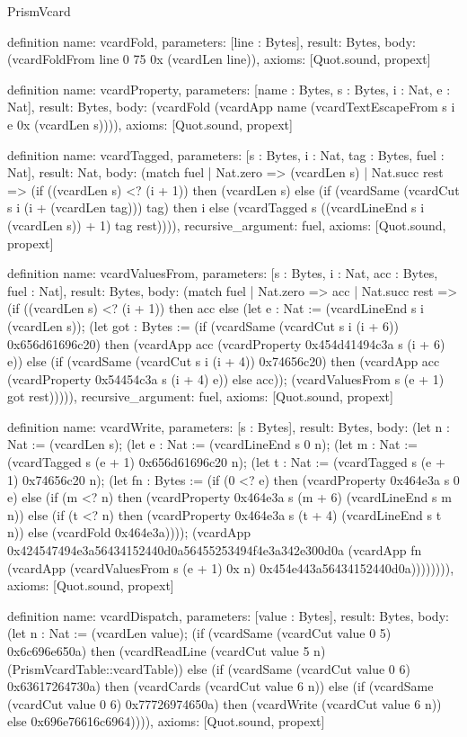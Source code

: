 \begin{lexlean}{PrismVcard}
\begin{semanticmodule}
definition{
  name: vcardFold,
  parameters: [line : Bytes],
  result: Bytes,
  body: (vcardFoldFrom line 0 75 0x (vcardLen line)),
  axioms: [Quot.sound, propext]
}

definition{
  name: vcardProperty,
  parameters: [name : Bytes, s : Bytes, i : Nat, e : Nat],
  result: Bytes,
  body: (vcardFold (vcardApp name (vcardTextEscapeFrom s i e 0x (vcardLen s)))),
  axioms: [Quot.sound, propext]
}

definition{
  name: vcardTagged,
  parameters: [s : Bytes, i : Nat, tag : Bytes, fuel : Nat],
  result: Nat,
  body: (match fuel
    | Nat.zero => (vcardLen s)
    | Nat.succ rest => (if ((vcardLen s) <? (i + 1)) then (vcardLen s) else (if (vcardSame (vcardCut s i (i + (vcardLen tag))) tag) then i else (vcardTagged s ((vcardLineEnd s i (vcardLen s)) + 1) tag rest)))),
  recursive_argument: fuel,
  axioms: [Quot.sound, propext]
}

definition{
  name: vcardValuesFrom,
  parameters: [s : Bytes, i : Nat, acc : Bytes, fuel : Nat],
  result: Bytes,
  body: (match fuel
    | Nat.zero => acc
    | Nat.succ rest => (if ((vcardLen s) <? (i + 1)) then acc else (let e : Nat := (vcardLineEnd s i (vcardLen s)); (let got : Bytes := (if (vcardSame (vcardCut s i (i + 6)) 0x656d61696c20) then (vcardApp acc (vcardProperty 0x454d41494c3a s (i + 6) e)) else (if (vcardSame (vcardCut s i (i + 4)) 0x74656c20) then (vcardApp acc (vcardProperty 0x54454c3a s (i + 4) e)) else acc)); (vcardValuesFrom s (e + 1) got rest))))),
  recursive_argument: fuel,
  axioms: [Quot.sound, propext]
}

definition{
  name: vcardWrite,
  parameters: [s : Bytes],
  result: Bytes,
  body: (let n : Nat := (vcardLen s); (let e : Nat := (vcardLineEnd s 0 n); (let m : Nat := (vcardTagged s (e + 1) 0x656d61696c20 n); (let t : Nat := (vcardTagged s (e + 1) 0x74656c20 n); (let fn : Bytes := (if (0 <? e) then (vcardProperty 0x464e3a s 0 e) else (if (m <? n) then (vcardProperty 0x464e3a s (m + 6) (vcardLineEnd s m n)) else (if (t <? n) then (vcardProperty 0x464e3a s (t + 4) (vcardLineEnd s t n)) else (vcardFold 0x464e3a)))); (vcardApp 0x424547494e3a56434152440d0a56455253494f4e3a342e300d0a (vcardApp fn (vcardApp (vcardValuesFrom s (e + 1) 0x n) 0x454e443a56434152440d0a)))))))),
  axioms: [Quot.sound, propext]
}

definition{
  name: vcardDispatch,
  parameters: [value : Bytes],
  result: Bytes,
  body: (let n : Nat := (vcardLen value); (if (vcardSame (vcardCut value 0 5) 0x6c696e650a) then (vcardReadLine (vcardCut value 5 n) (PrismVcardTable::vcardTable)) else (if (vcardSame (vcardCut value 0 6) 0x63617264730a) then (vcardCards (vcardCut value 6 n)) else (if (vcardSame (vcardCut value 0 6) 0x77726974650a) then (vcardWrite (vcardCut value 6 n)) else 0x696e76616c6964)))),
  axioms: [Quot.sound, propext]
}
\end{semanticmodule}
\end{lexlean}
